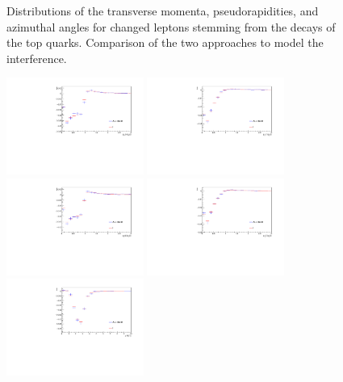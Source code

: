 \begin{figure}
  \caption{Distributions of the transverse momenta, pseudorapidities, and azimuthal angles for changed leptons stemming from the decays of the top quarks. Comparison of the two approaches to model the interference.}
  \label{fig:comparison_leptons}
\end{figure}

\begin{figure} \centering
  \includegraphics[width=0.4\textwidth]{fig/chapt4/gen_plots/b_over_t_pt_compare.pdf}
  \includegraphics[width=0.4\textwidth]{fig/chapt4/gen_plots/lp_over_t_pt_compare.pdf}\\
  \includegraphics[width=0.4\textwidth]{fig/chapt4/gen_plots/bbar_over_tbar_pt_compare.pdf}
  \includegraphics[width=0.4\textwidth]{fig/chapt4/gen_plots/lm_over_tbar_pt_compare.pdf}\\
  \includegraphics[width=0.4\textwidth]{fig/chapt4/gen_plots/ll_deltaR_compare.pdf}

\end{figure}
